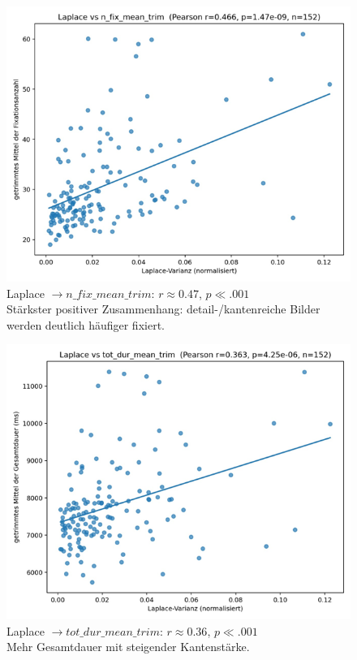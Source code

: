 \documentclass[
    language=german, %
    thesis=seminar, %
    supervisor=postdoc, %
    multiauthor=true, %
    ]{settings/csssa-thesis}
\begin{document}
\begin{figure}[h]
    \centering
    \includegraphics[width=\linewidth,height=0.8\textheight,keepaspectratio]{figures/Bild7.png}
    \caption{Laplace $\rightarrow n\_fix\_mean\_trim$: $r \approx 0.47$, $p \ll .001$ \\
          Stärkster positiver Zusammenhang: detail-/kantenreiche Bilder werden deutlich häufiger fixiert. }\label{fig:bild7}
\end{figure}
\begin{figure}[h]
    \centering
    \includegraphics[width=\linewidth,height=0.8\textheight,keepaspectratio]{figures/Bild8.png}
    \caption{Laplace $\rightarrow tot\_dur\_mean\_trim$: $r \approx 0.36$, $p \ll .001$ \\
          Mehr Gesamtdauer mit steigender Kantenstärke.  }\label{fig:bild8}
\end{figure}
\end{document}
